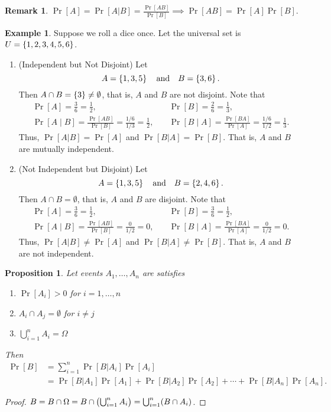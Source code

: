 \documentclass[12pt,openany]{book}
\newtheorem{proposition}[theorem]{Proposition}
\theoremstyle{definition}
\newtheorem{remark}{Remark}[chapter]
\newtheorem{example}{Example}[chapter]
\begin{document}
	\begin{remark}
		$\displaystyle\Pr[A]=\Pr[A|B]=\frac{\Pr[AB]}{\Pr[B]}\implies \Pr[AB]=\Pr[A]\Pr[B]$.
	\end{remark}
	\vspace{10pt}
	\begin{example}
		Suppose we roll a dice once. Let the universal set is $U=\set{1,2,3,4,5,6}$.
		\begin{enumerate}[(1)]
			\item (Independent but Not Disjoint) Let \[
			A=\set{1,3,5}\quad\text{and}\quad B=\set{3,6}.
			\] Then $A\cap B=\set{3}\neq\emptyset$, that is, $A$ and $B$ are not disjoint. Note that \begin{align*}
				\Pr[A]=\frac{3}{6}=\frac{1}{2},\quad&\Pr[B]=\frac{2}{6}=\frac{1}{3},\\
				\Pr[A\mid B]=\frac{\Pr[AB]}{\Pr[B]}=\frac{1/6}{1/3}=\frac{1}{2},\quad&\Pr[B\mid A]=\frac{\Pr[BA]}{\Pr[A]}=\frac{1/6}{1/2}=\frac{1}{3}.
			\end{align*} Thus, $\Pr[A|B]=\Pr[A]$ and $\Pr[B|A]=\Pr[B]$. That is, $A$ and $B$ are mutually independent.
			\item (Not Independent but Disjoint) Let \[
			A=\set{1,3,5}\quad\text{and}\quad B=\set{2,4,6}.
			\] Then $A\cap B=\emptyset$, that is, $A$ and $B$ are disjoint. Note that \begin{align*}
				\Pr[A]=\frac{3}{6}=\frac{1}{2},\quad&\Pr[B]=\frac{3}{6}=\frac{1}{2},\\
				\Pr[A\mid B]=\frac{\Pr[AB]}{\Pr[B]}=\frac{0}{1/2}=0,\quad&\Pr[B\mid A]=\frac{\Pr[BA]}{\Pr[A]}=\frac{0}{1/2}=0.
			\end{align*} Thus, $\Pr[A|B]\neq\Pr[A]$ and $\Pr[B|A]\neq\Pr[B]$. That is, $A$ and $B$ are not independent.
		\end{enumerate}
	\end{example}
	\vspace{20pt}
	\begin{tcolorbox}[colback=white,colframe=procolor,arc=5pt,title={\color{white}\bf Rule of Total Probailtiy}]
		\begin{proposition}
			Let events $A_1,\dots,A_n$ are satisfies
			\begin{enumerate}[(1)]
				\item $\Pr[A_i]>0$ for $i=1,\dots,n$
				\item $A_i\cap A_j=\emptyset$ for $i\neq j$
				\item $\bigcup_{i=1}^nA_i=\Omega$
			\end{enumerate} Then \begin{align*}
				\Pr[B]&=\sum_{i=1}^n\Pr[B|A_i]\Pr[A_i]\\
				&=\Pr[B|A_1]\Pr[A_1]+\Pr[B|A_2]\Pr[A_2]+\cdots+\Pr[B|A_n]\Pr[A_n].
			\end{align*}
		\end{proposition}
	\end{tcolorbox}
	\begin{proof}
		$B=B\cap\Omega=B\cap\del{\bigcup_{i=1}^nA_i}=\bigcup_{i=1}^n(B\cap A_i)$.
	\end{proof}
	\vspace{20pt}
\end{document}

